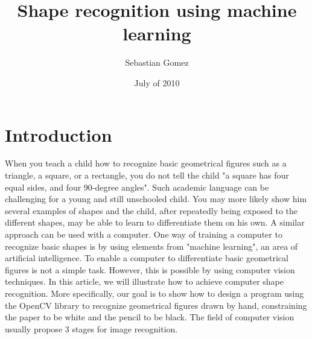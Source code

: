 \documentclass{article}
\begin{document}
\title {Shape recognition using machine learning}
\author {Sebastian Gomez}
\date {July of 2010}
\maketitle

	\section{Introduction}
	When you teach a child how to recognize basic geometrical figures such as
	a triangle, a square, or a rectangle, you do not tell the child "a square has four
	equal sides, and four 90-degree angles". Such academic language can be challenging for 
	a young and still unschooled child. You may more likely show him several examples
	of shapes and the child, after repeatedly being exposed to the different shapes, may 
	be able to learn to differentiate them on his own. \newline
	A similar approach can be used with a computer. One way of training a computer to
	recognize basic shapes is by using elements from "machine learning", an area of
	artificial intelligence. To enable a computer to differentiate basic geometrical 
	figures is not a simple task. However, this is possible by using computer vision 
	techniques. In this article, we will illustrate how to achieve computer shape 
	recognition. More specifically, our goal is to show how to design a program using
	the OpenCV library to recognize geometrical figures drawn by hand, constraining
	the paper to be white and the pencil to be black. The field of computer vision
	usually	propose 3 stages for image recognition.
	
\end{document}
